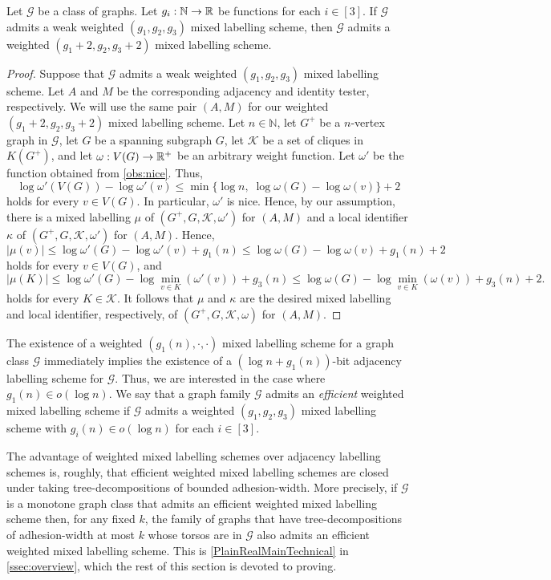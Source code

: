 \documentclass{patmorin}
\renewcommand{\le}{\leqslant}
\renewcommand{\leq}{\leqslant}
\newcommand{\pat}[1]{\textcolor{Magenta}{PaMo: #1}}
\newcommand{\piotr}[1]{\textcolor{red}{PiMi: #1}}
\newcommand{\defin}[1]{\emph{\textcolor{brightmaroon}{#1}}}
\newcommand{\NN}{\mathbb{N}}
\newcommand{\calG}{\mathcal{G}}
\newcommand{\calK}{\mathcal{K}}
\begin{document}
\begin{lem}
    \label{lem:nice_weights}
    Let $\calG$ be a class of graphs. 
    Let $g_i:\mathbb{N}\to\mathbb{R}$ be functions for each $i\in[3]$. 
    If $\calG$ admits a weak weighted $(g_1,g_2,g_3)$ mixed labelling scheme, then $\calG$ admits a weighted $(g_1+2,g_2,g_3+2)$ mixed labelling scheme. %
\end{lem}
\begin{proof}
    Suppose that $\calG$ admits a weak weighted $(g_1,g_2,g_3)$ mixed labelling scheme. 
    Let $A$ and $M$ be the corresponding adjacency and identity tester, respectively. 
    We will use the same pair $(A, M)$ for our weighted $(g_1+2,g_2,g_3+2)$ mixed labelling scheme.   
    Let $n\in \NN$, let $G^+$ be a  $n$-vertex graph  in $\calG$, let $G$ be a spanning subgraph $G$, let $\calK$ be a set of cliques  in $K(G^+)$, and let $\omega:V(G)\to \mathbb{R}^+$ be an arbitrary weight function. 
    Let $\omega'$ be the function obtained from \cref{obs:nice}. 
    Thus,
    \[
    \log\omega'(V(G))-\log\omega'(v)\le\min\{\log n,\;\log\omega(G)-\log\omega(v)\}+2
    \] 
    holds for every $v\in V(G)$. 
    In particular, $\omega'$ is nice. 
    Hence, by our assumption, there is a mixed labelling $\mu$ of $(G^+,G,\calK,\omega')$ for $(A,M)$ and a local identifier $\kappa$ of $(G^+,G,\calK,\omega')$ for $(A,M)$. 
    Hence, 
    \[
    |\mu(v)| \leq \log \omega'(G) - \log\omega'(v) + g_1(n) \leq \log \omega(G) - \log\omega(v) + g_1(n) + 2
    \]
    holds for every $v\in V(G)$, and 
    \[
    |\mu(K)|\le \log \omega'(G) - \log\min_{v\in K}(\omega'(v)) + g_3(n) 
    \leq \log \omega(G) - \log\min_{v\in K}(\omega(v)) + g_3(n) + 2.
    \]
    holds for every $K\in \calK$. 
    It follows that $\mu$ and  $\kappa$ are the desired  mixed labelling and local identifier, respectively,  of $(G^+,G,\calK,\omega)$ for $(A,M)$. 
\end{proof}


The existence of a weighted $(g_1(n),\cdot,\cdot)$ mixed labelling scheme for a graph class $\calG$ immediately implies the existence of a $(\log n+g_1(n))$-bit adjacency labelling scheme for $\calG$. Thus, we are interested in the case where $g_1(n)\in o(\log n)$. We say that a graph family $\calG$ admits an \defin{efficient} weighted mixed labelling scheme if $\calG$ admits a weighted $(g_1,g_2,g_3)$ mixed labelling scheme with $g_i(n)\in o(\log n)$ for each $i\in [3]$.

The advantage of weighted mixed labelling schemes over adjacency labelling schemes is, roughly, that efficient weighted mixed labelling schemes are closed under taking tree-decompositions of bounded adhesion-width. More precisely, if $\calG$ is a monotone graph class that admits an efficient weighted mixed labelling scheme then, for any fixed $k$, the family of graphs that have tree-decompositions of adhesion-width at most $k$ whose torsos are in $\calG$ also admits an efficient weighted mixed labelling scheme. This is \cref{PlainRealMainTechnical} in \cref{ssec:overview}, which the rest of this section is devoted to proving.
\end{document}
